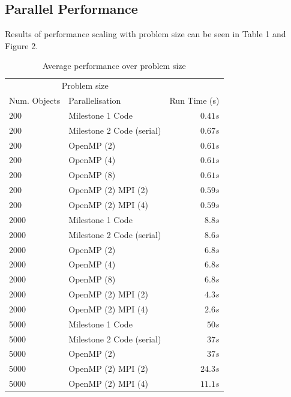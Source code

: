 \documentclass[twoside,twocolumn]{article}
\begin{document}
	
		
	
	\subsection{Parallel Performance}
	Results of performance scaling with problem size can be seen in Table 1 and Figure 2. \newline
	
	\begin{table}[H]
		\caption{Average performance over problem size}
		\centering
		\begin{tabular}{llr}
			\toprule
			\multicolumn{2}{c}{Problem size} \\
			\cmidrule(r){1-2}
			Num. Objects & Parallelisation & Run Time (s) \\
			\midrule
			200 & Milestone 1 Code & $0.41s$ \\
			200 & Milestone 2 Code (serial) & $0.67s$ \\
			200 & OpenMP (2) & $0.61s$ \\
			200 & OpenMP (4) & $0.61s$ \\
			200 & OpenMP (8) & $0.61s$ \\
			200 & OpenMP (2) MPI (2) & $0.59s$ \\
			200 & OpenMP (2) MPI (4) & $0.59s$ \\
			\midrule
			2000 & Milestone 1 Code & $8.8s$ \\
			2000 & Milestone 2 Code (serial) & $8.6s$ \\
			2000 & OpenMP (2) & $6.8s$ \\
			2000 & OpenMP (4) & $6.8s$ \\
			2000 & OpenMP (8) & $6.8s$ \\
			2000 & OpenMP (2) MPI (2) & $4.3s$ \\
			2000 & OpenMP (2) MPI (4) & $2.6s$ \\
			\midrule
			5000 & Milestone 1 Code & $50s$ \\
			5000 & Milestone 2 Code (serial) & $37s$ \\
			5000 & OpenMP (2) & $37s$ \\
			5000 & OpenMP (2) MPI (2) & $24.3s$ \\
			5000 & OpenMP (2) MPI (4) & $11.1s$ \\

			\bottomrule
		\end{tabular}
	\end{table}	
	
\end{document}
